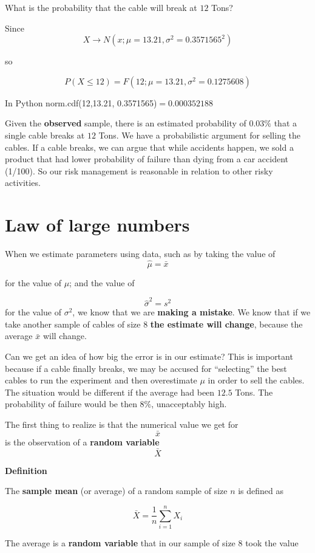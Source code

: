 \documentclass[
]{book}
\begin{document}
What is the probability that the cable will break at \(12\) Tons?

Since \[X \rightarrow N(x; \mu=13.21, \sigma^2=0.3571565^2)\]

so

\[P(X \leq 12)= F(12; \mu=13.21, \sigma^2=0.1275608)\]

In Python norm.cdf(12,13.21, 0.3571565)\(=0.000352188\)

Given the \textbf{observed} sample, there is an estimated probability of \(0.03\%\) that a single cable breaks at \(12\) Tons. We have a probabilistic argument for selling the cables. If a cable breaks, we can argue that while accidents happen, we sold a product that had lower probability of failure than dying from a car accident (1/100). So our risk management is reasonable in relation to other risky activities.

\hypertarget{law-of-large-numbers}{%
\section{Law of large numbers}\label{law-of-large-numbers}}

When we estimate parameters using data, such as by taking the value of \[\hat{\mu}=\bar{x}\]

for the value of \(\mu\); and the value of

\[\hat{\sigma}^2=s^2\]
for the value of \(\sigma^2\), we know that we are \textbf{making a mistake}. We know that if we take another sample of cables of size \(8\) \textbf{the estimate will change}, because the average \(\bar{x}\) will change.

Can we get an idea of how big the error is in our estimate? This is important because if a cable finally breaks, we may be accused for ``selecting'' the best cables to run the experiment and then overestimate \(\mu\) in order to sell the cables. The situation would be different if the average had been \(12.5\) Tons. The probability of failure would be then \(8\%\), unacceptably high.

The first thing to realize is that the numerical value we get for \[\bar{x}\] is the observation of a \textbf{random variable} \[\bar{X}\]

\textbf{Definition}

The \textbf{sample mean} (or average) of a random sample of size \(n\) is defined as

\[\bar{X}=\frac{1}{n}\sum_{i=1}^n X_i\]

The average is a \textbf{random variable} that in our sample of size \(8\) took the value
\end{document}
